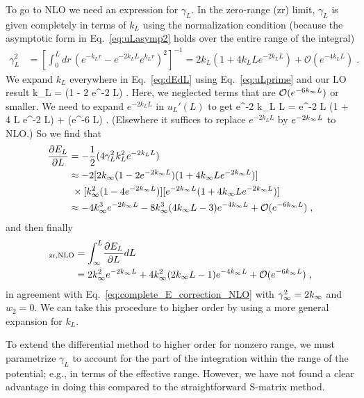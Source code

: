 	To go to NLO we need an expression for $\gamma_L$.  In the zero-range
	(zr) limit, $\gamma_L$ is given completely in terms of $k_L$ using the
	normalization condition (because the asymptotic form in
	Eq.~\eqref{eq:uLasymp2} holds
	over the entire range of the integral)
	\begin{align}
	  \gamma_L^2 &= \left[\int_0^L\! dr\, (e^{-k_L r} - e^{-2k_L L}e^{k_L r})^2
		\right]^{-1}
	  =
	  2 k_L(1 + 4 k_L L e^{-2 k_L L}) + \mathcal{O}(e^{-4 k_L L}) \;.
	\end{align}
	We expand $k_L$ everywhere in Eq.~\eqref{eq:dEdL} using
	Eq.~\eqref{eq:uLprime} and our LO result
	\beq
	   k_L = \kinf (1 - 2 e^{-2 \kinf L})
	   \;.
	\eeq
	Here, we neglected terms that are $\mathcal{O}(e^{-6 k_{\infty} L})$ or smaller.
	We need to expand $e^{-2 k_L L}$ in $u_L'(L)$ to get
	\beq
	   e^{-2 k_L L} = e^{-2 \kinf L} (1 + 4 \kinf L e^{-2 \kinf L})
	    + (e^{-6 \kinf L}) \;.
	\eeq
	(Elsewhere it suffices to replace $e^{-2 k_L L}$ by $e^{-2 k_{\infty} L}$ to NLO.)
	So we find that
	\begin{align}
	  \frac{\partial E_L}{\partial L} &= -\frac12 (4 \gamma_L^2 k_L^2
		e^{-2 k_L L})
	  \nonumber \\
	  &\approx -2  [2\kinf (1 - 2 e^{-2 \kinf L})(1 + 4 \kinf L
		e^{-2 \kinf L})]
	  \nonumber \\
	  & \  \null \times [\kinf^2 (1 - 4 e^{-2\kinf L})][e^{-2 \kinf L}
		(1 + 4 \kinf L e^{-2 \kinf L})]
	  \nonumber \\
	  &\approx
	  -4 \kinf^3 e^{-2 \kinf L} -  8 \kinf^3 (4\kinf L - 3)e^{-4 \kinf L}
	  + \mathcal{O}(e^{-6 \kinf L})
	  \;,
	\end{align}
	and then finally
	\begin{align}
	[\Delta E_L]_{\rm zr, NLO}
	     &= \int_\infty^L\! \frac{\partial E_L}{\partial L} dL
	     \nonumber \\
	     &=
	     2 \kinf^2 e^{-2 \kinf L} +  4 \kinf^2 (2\kinf L - 1)e^{-4 \kinf L}
	     + \mathcal{O}(e^{-6 \kinf L})
	     \;,
	\end{align}
	in agreement with Eq.~\eqref{eq:complete_E_correction_NLO}
	with $\gamma_\infty^2 = 2k_{\infty}$ and $w_2 = 0$.
	We can take this procedure to higher order by
	using a more general expansion for $k_L$.

	To extend the differential method
	to higher order for nonzero range, we must parametrize
	$\gamma_L$ to account for the part of the integration within the
	range of the potential; e.g., in terms of the effective range.  However,
	we have not found a clear advantage in doing this
	compared to the straightforward S-matrix method.

